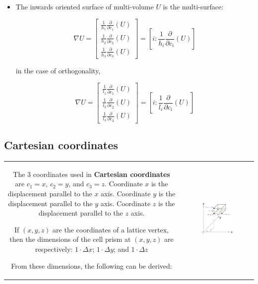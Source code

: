 \begin{itemize}

\item The inwards oriented surface of multi-volume \(U\) is the multi-surface:

\[\nabla U = \begin{bmatrix} \frac{1}{h_1}\frac{\partial}{\partial c_1}(U) \\ \frac{1}{h_2}\frac{\partial}{\partial c_2}(U) \\ \frac{1}{h_3}\frac{\partial}{\partial c_3}(U) \end{bmatrix} = \left[ i :  \frac{1}{h_i}\frac{\partial}{\partial c_i}(U)\right]\]

in the case of orthogonality, 

\[\nabla U = \begin{bmatrix} \frac{1}{l_1}\frac{\partial}{\partial c_1}(U) \\ \frac{1}{l_2}\frac{\partial}{\partial c_2}(U) \\ \frac{1}{l_3}\frac{\partial}{\partial c_3}(U) \end{bmatrix} = \left[ i :  \frac{1}{l_i}\frac{\partial}{\partial c_i}(U)\right]\]

\end{itemize} 




\subsection{Cartesian coordinates} 

\begin{tabular}{cc}
\parbox{0.5\textwidth}{
The 3 coordinates used in {\bf Cartesian coordinates} are \(c_1 = x\), \(c_2 = y\), and \(c_3 = z\). Coordinate \(x\) is the displacement parallel to the \(x\) axis. Coordinate \(y\) is the displacement parallel to the \(y\) axis. Coordinate \(z\) is the displacement parallel to the \(z\) axis.

If \((x,y,z)\) are the coordinates of a lattice vertex, then the dimensions of the cell prism at \((x,y,z)\) are respectively:
\(1 \cdot \Delta x\); \(1 \cdot \Delta y\); and \(1 \cdot \Delta z\)

From these dimensions, the following can be derived:
} & \parbox{0.5\textwidth}{
\includegraphics[width = 0.5\textwidth]{Coordinate_systems/Cartesian_coordinates}
}
\end{tabular}

